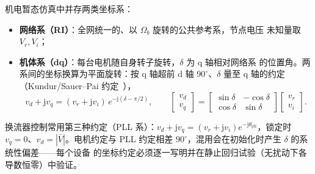 \begin{remark}\label{rem:dy-th-mac-frames}
机电暂态仿真中并存两类坐标系：
\begin{itemize}
  \item \textbf{网络系（RI）}：全网统一的、以 $\Omega_b$ 旋转的公共参考系，节点电压
        未知量取 $V_r,V_i$；
  \item \textbf{机体系（dq）}：每台电机随自身转子旋转，$\delta$ 为 q 轴相对网络系
        的位置角。两系间的坐标换算为平面旋转：按 q 轴超前 d 轴 $90^\circ$、$\delta$
        量至 q 轴的约定（Kundur/Sauer--Pai 约定~\cite{dym:kundur,dym:sauer-pai}），
        \begin{equation}
        v_d+\mathrm jv_q=(v_r+\mathrm jv_i)\,e^{-\mathrm j(\delta-\pi/2)},
        \qquad
        \begin{bmatrix}v_d\\v_q\end{bmatrix}
        =\begin{bmatrix}\sin\delta&-\cos\delta\\\cos\delta&\sin\delta\end{bmatrix}
        \begin{bmatrix}v_r\\v_i\end{bmatrix}.
        \label{eq:dy-th-mac-ri-dq}
        \end{equation}
\end{itemize}
换流器控制常用第三种约定（PLL 系）：$v_d+\mathrm jv_q=(v_r+\mathrm jv_i)
e^{-\mathrm j\theta_{\mathrm{pll}}}$，锁定时 $v_q=0$、$v_d=|\bar V|$。电机约定与
PLL 约定相差 $90^\circ$，混用会在初始化时产生 $\delta$ 的系统性偏差——每个设备
的坐标约定必须逐一写明并在静止回归试验（无扰动下各导数恒零）中验证。
\end{remark}

